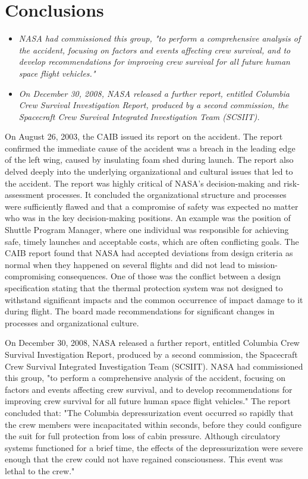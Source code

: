 \section{Conclusions}\label{conclusions}

\begin{itemize}
\item
  \emph{NASA had commissioned this group, "to perform a comprehensive
  analysis of the accident, focusing on factors and events affecting
  crew survival, and to develop recommendations for improving crew
  survival for all future human space flight vehicles."}
\item
  \emph{On December 30, 2008, NASA released a further report, entitled
  Columbia Crew Survival Investigation Report, produced by a second
  commission, the Spacecraft Crew Survival Integrated Investigation Team
  (SCSIIT).}
\end{itemize}

On August 26, 2003, the CAIB issued its report on the accident. The
report confirmed the immediate cause of the accident was a breach in the
leading edge of the left wing, caused by insulating foam shed during
launch. The report also delved deeply into the underlying organizational
and cultural issues that led to the accident. The report was highly
critical of NASA's decision-making and risk-assessment processes. It
concluded the organizational structure and processes were sufficiently
flawed and that a compromise of safety was expected no matter who was in
the key decision-making positions. An example was the position of
Shuttle Program Manager, where one individual was responsible for
achieving safe, timely launches and acceptable costs, which are often
conflicting goals. The CAIB report found that NASA had accepted
deviations from design criteria as normal when they happened on several
flights and did not lead to mission-compromising consequences. One of
those was the conflict between a design specification stating that the
thermal protection system was not designed to withstand significant
impacts and the common occurrence of impact damage to it during flight.
The board made recommendations for significant changes in processes and
organizational culture.

On December 30, 2008, NASA released a further report, entitled Columbia
Crew Survival Investigation Report, produced by a second commission, the
Spacecraft Crew Survival Integrated Investigation Team (SCSIIT). NASA
had commissioned this group, "to perform a comprehensive analysis of the
accident, focusing on factors and events affecting crew survival, and to
develop recommendations for improving crew survival for all future human
space flight vehicles." The report concluded that: "The Columbia
depressurization event occurred so rapidly that the crew members were
incapacitated within seconds, before they could configure the suit for
full protection from loss of cabin pressure. Although circulatory
systems functioned for a brief time, the effects of the depressurization
were severe enough that the crew could not have regained consciousness.
This event was lethal to the crew."

